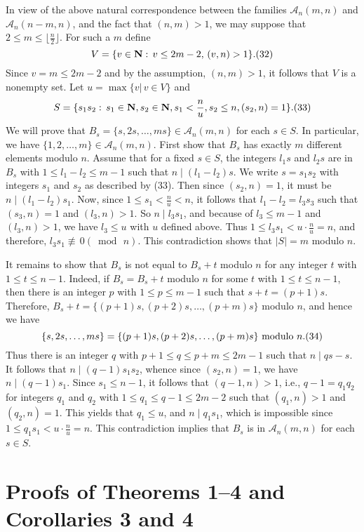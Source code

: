 \documentclass[12pt]{amsart}
\begin{document}
{In view of the above natural correspondence between
the families ${\mathcal A}_n(m,n)$ and ${\mathcal A}_n(n-m,n)$, and the fact that 
$(n,m)>1$, we may suppose that $2\le m\le\lfloor\frac{n}{2}\rfloor$. 
For such a $m$ define
    $$
V=\{v\in{\rm{\bf N}}:\, v\le 2m-2,\,(v,n)>1\}.\relax(32)
$$
Since $v=m\le 2m-2$ and by the assumption, $(n,m)>1$, 
it follows that $V$ is a  nonempty set. Let $u=\max\{v|\, v\in V\}$ and
 $$
S=\{s_1s_2:\, s_1\in {\rm{\bf N}}, s_2\in {\rm{\bf N}}, s_1<\frac{n}{u},
s_2\le n, (s_2,n)=1\}.\relax(33)
 $$
We will prove that $B_s=\{s,2s,\ldots, ms\}\in {\mathcal A}_n(m,n)$
for each $s\in S$. In particular, we have 
 $\{1,2,\ldots, m\}\in {\mathcal A}_n(m,n)$.
 First show that $B_s$ has exactly $m$ different elements modulo $n$. 
Assume that for a fixed $s\in S$, the integers $l_1s$ and $l_2s$ are in 
$B_s$ with 
$1\le l_1-l_2\le m-1$ such that $n\mid (l_1-l_2)s$. We write $s=s_1s_2$ with 
integers $s_1$ and $s_2$ as described by  (33). Then 
since  $(s_2,n)=1$, it must be $n\mid (l_1-l_2)s_1$. Now,
since $1\le s_1<\frac{n}{u}< n$, it follows that  $l_1-l_2=l_3s_3$ 
such that $(s_3,n)=1$ and $(l_3,n)>1$. So $n\mid l_3s_1$, and because of 
$l_3\le m-1$ and $(l_3,n)>1$, we have $l_3\le u$ with $u$  defined above. 
Thus $1\le l_3s_1<u\cdot \frac{n}{u}=n$, and therefore, 
$l_3s_1 \not\equiv\, 0{(\bmod\, n)}$.
This contradiction shows that $|S|=m$ modulo $n$.

It remains to show that $B_s$ is not equal to
$B_s+t$ modulo $n$ for any integer $t$ with $1\le t\le n-1$.
Indeed, if  $B_s=B_s+t$ modulo $n$ for some $t$ with $1\le t\le n-1$,
then there is an integer $p$ with $1\le p\le m-1$ such that $s+t=(p+1)s$.
Therefore, $B_s+t= \{(p+1)s, (p+2)s,\ldots,(p+m)s\}$ modulo $n$, and hence 
we have
   $$
\{s,2s,\ldots, ms\}=\{(p+1)s, (p+2)s,\ldots,(p+m)s\}\,\,{\rm modulo}\,\, n.
\relax(34) 
$$
Thus there is an integer $q$ with $p+1\le q\le p+m\le 2m-1$ such that
$n\mid qs-s$. It follows that 
$n\mid (q-1)s_1s_2$, whence
since $(s_2,n)=1$, we have $n\mid (q-1)s_1$. Since $s_1\le n-1$, 
it follows that $(q-1,n)>1$, i.e., $q-1=q_1q_2$ for integers $q_1$ and $q_2$ 
with $1\le q_1\le q-1\le 2m-2$ such that $(q_1,n)>1$ and $(q_2,n)=1$. 
This yields that $q_1\le u$, and $n\mid  q_1s_1$, which is impossible since
$1\le q_1s_1<u\cdot\frac{n}{u}=n$. This contradiction implies 
that  $B_s$ is in ${\mathcal A}_n(m,n)$ for each $s\in S$.


\section{Proofs of Theorems 1--4  and Corollaries 3 and 4}

}
\end{document}
